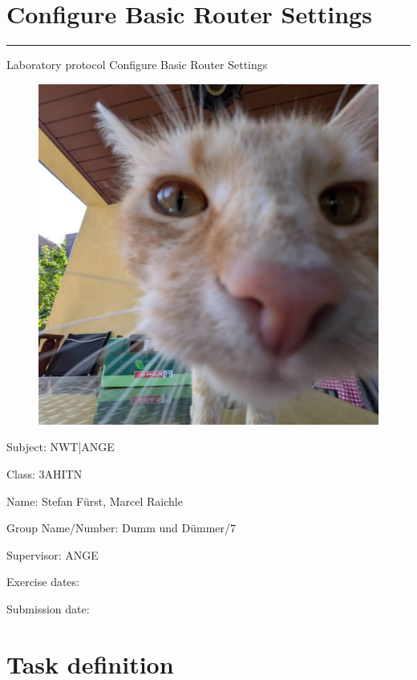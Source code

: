 \documentclass[a4paper]{article}
\begin{document}

\pagestyle{oida}
\section*{Configure Basic Router Settings}
\par\noindent\rule{\textwidth}{0.4pt}

Laboratory protocol
Configure Basic Router Settings

\begin{figure}[h]
	\includegraphics[scale=0.2]{images/mika.jpeg}
	\centering
\end{figure}

\vspace*{\fill}
Subject:	NWT|ANGE

Class:	3AHITN

Name:	Stefan Fürst, Marcel Raichle

Group Name/Number: Dumm und Dümmer/7

Supervisor: 	ANGE

Exercise dates:	

Submission date:


\newpage
\tableofcontents

\newpage

\section{Task definition}
\end{document}
